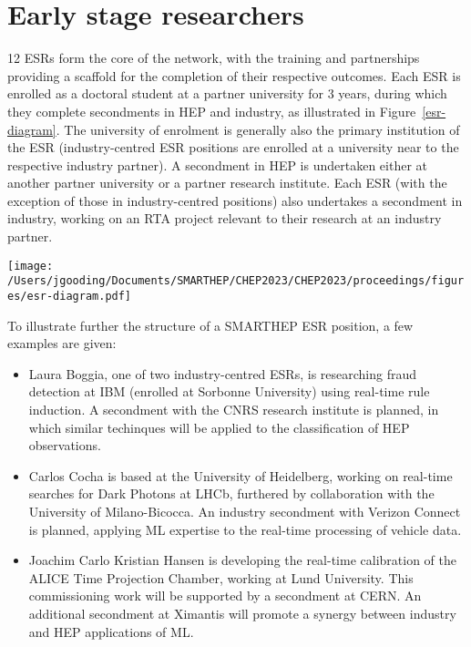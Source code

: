 \section{Early stage researchers}
\label{esrs}
12 ESRs form the core of the network, with the training and partnerships providing a scaffold for the completion of their respective outcomes. Each ESR is enrolled as a doctoral student at a partner university for 3 years, during which they complete secondments in HEP and industry, as illustrated in Figure~\ref{esr-diagram}. The university of enrolment is generally also the primary institution of the ESR (industry-centred ESR positions are enrolled at a university near to the respective industry partner). A secondment in HEP is undertaken either at another partner university or a partner research institute. Each ESR (with the exception of those in industry-centred positions) also undertakes a secondment in industry, working on an RTA project relevant to their research at an industry partner.\par

\begin{figure*}[h!]
    \centering
    \texttt{[image: /Users/jgooding/Documents/SMARTHEP/CHEP2023/CHEP2023/proceedings/figures/esr-diagram.pdf]}
    \caption{Structure of a SMARTHEP ESR position. Each ESR is enrolled (i.), during which they will undertake secondments with network partners in HEP (ii.) and industry (iii.). Through the combination of primary and secondment work, each ESR will complete goals in HEP (iv.) and industry (v.), discussed in further detail in Section~\ref{goals}. Precise durations of the secondments vary between ESR positions.}
    \label{esr-diagram}       %
\end{figure*}

To illustrate further the structure of a SMARTHEP ESR position, a few examples are given:
\begin{itemize}
    \item  Laura Boggia, one of two industry-centred ESRs, is researching fraud detection at IBM (enrolled at Sorbonne University) using real-time rule induction. A secondment with the CNRS research institute is planned, in which similar techinques will be applied to the classification of HEP observations. 
    \item Carlos Cocha is based at the University of Heidelberg, working on real-time searches for Dark Photons at LHCb, furthered by collaboration with the University of Milano-Bicocca. An industry secondment with Verizon Connect is planned, applying ML expertise to the real-time processing of vehicle data.
    \item Joachim Carlo Kristian Hansen is developing the real-time calibration of the ALICE Time Projection Chamber, working at Lund University. This commissioning work will be supported by a secondment at CERN. An additional secondment at Ximantis will promote a synergy between industry and HEP applications of ML.
\end{itemize}